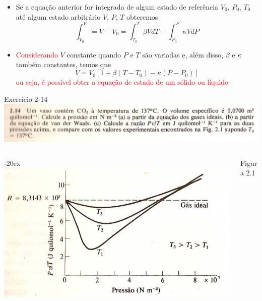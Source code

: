 \begin{frame}
    \begin{itemize}
        \item Se a equação anterior for integrada de algum estado de referência
            \(V_0\), \(P_0\), \(T_0\) até algum estado arbitrário
            \(V\), \(P\), \(T\) obteremos
            \[
                \int_{V_0}^V = V-V_0 = \int_{T_0}^T \beta V dT
                - \int_{P_0}^P \kappa V dP
            \]
        \item \textcolor{red}{Considerando} \(V\) constante  quando \(P\) e \(T\)
            são variadas e, além disso, \(\beta\) e \(\kappa\) também
            constantes, temos que
            \[
                V=V_0 [ 1+\beta (T-T_0) - \kappa (P-P_0)]
            \]
            \textcolor{red}{ou seja, é possível obter a equação de estado de um sólido ou líquido}
    \end{itemize}
\end{frame}

\begin{frame}{Exercício 2-14}
    \centering
    \includegraphics[width=\textwidth]{images/Captura de tela de 2023-04-12 13-20-49.png} \\
    \begin{columns}[c]
        \begin{column}{\textwidth-20ex}
            \includegraphics[height=\textheight-93pt-2pt]{images/Captura de tela de 2023-04-12 13-23-51.png}
        \end{column}
        \begin{column}{20ex}
            Figura 2.1
        \end{column}
    \end{columns}
\end{frame}

